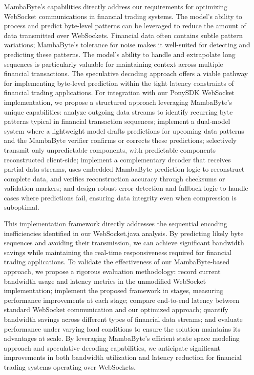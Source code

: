 \documentclass[a4paper, 11pt, twoside, openright]{report}
\begin{document}
MambaByte's capabilities directly address our requirements for optimizing WebSocket communications in financial trading systems. The model's ability to process and predict byte-level patterns can be leveraged to reduce the amount of data transmitted over WebSockets. Financial data often contains subtle pattern variations; MambaByte's tolerance for noise makes it well-suited for detecting and predicting these patterns. The model's ability to handle and extrapolate long sequences is particularly valuable for maintaining context across multiple financial transactions. The speculative decoding approach offers a viable pathway for implementing byte-level prediction within the tight latency constraints of financial trading applications. For integration with our PonySDK WebSocket implementation, we propose a structured approach leveraging MambaByte's unique capabilities: analyze outgoing data streams to identify recurring byte patterns typical in financial transaction sequences; implement a dual-model system where a lightweight model drafts predictions for upcoming data patterns and the MambaByte verifier confirms or corrects these predictions; selectively transmit only unpredictable components, with predictable components reconstructed client-side; implement a complementary decoder that receives partial data streams, uses embedded MambaByte prediction logic to reconstruct complete data, and verifies reconstruction accuracy through checksums or validation markers; and design robust error detection and fallback logic to handle cases where predictions fail, ensuring data integrity even when compression is suboptimal.

This implementation framework directly addresses the sequential encoding inefficiencies identified in our WebSocket.java analysis. By predicting likely byte sequences and avoiding their transmission, we can achieve significant bandwidth savings while maintaining the real-time responsiveness required for financial trading applications. To validate the effectiveness of our MambaByte-based approach, we propose a rigorous evaluation methodology: record current bandwidth usage and latency metrics in the unmodified WebSocket implementation; implement the proposed framework in stages, measuring performance improvements at each stage; compare end-to-end latency between standard WebSocket communication and our optimized approach; quantify bandwidth savings across different types of financial data streams; and evaluate performance under varying load conditions to ensure the solution maintains its advantages at scale. By leveraging MambaByte's efficient state space modeling approach and speculative decoding capabilities, we anticipate significant improvements in both bandwidth utilization and latency reduction for financial trading systems operating over WebSockets.
\end{document}
